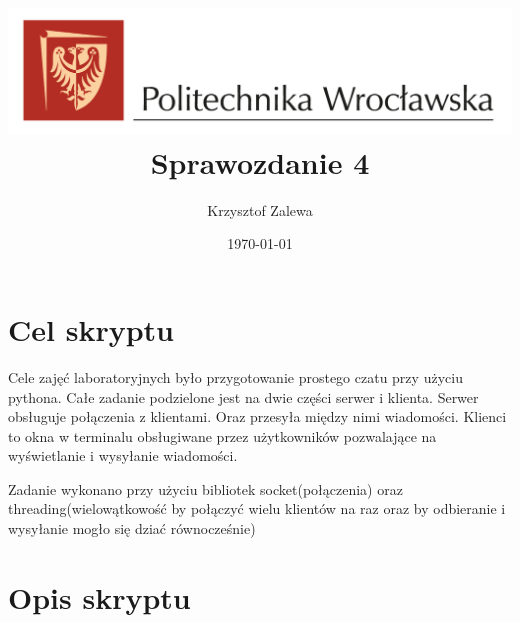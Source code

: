 \documentclass{article}
\title{
  \centering
  \includegraphics[width=\textwidth]{images/logo_PWr_kolor_poziom.png}\\
  \fontsize{28pt}{30pt}\selectfont Sprawozdanie 4\\
  }
\author{Krzysztof Zalewa}
\date{\daymonthyear\today}
\begin{document}
    \maketitle
    \pagebreak
    \tableofcontents
    \FloatBarrier
    \raggedright
    \section{Cel skryptu}
        Cele zajęć laboratoryjnych było przygotowanie prostego czatu przy użyciu pythona.
        Całe zadanie podzielone jest na dwie części serwer i klienta. Serwer obsługuje połączenia z klientami.
        Oraz przesyła między nimi wiadomości.
        Klienci to okna w terminalu obsługiwane przez użytkowników pozwalające na wyświetlanie i wysyłanie wiadomości.

        Zadanie wykonano przy użyciu bibliotek socket(połączenia) oraz threading(wielowątkowość by połączyć wielu klientów na raz
        oraz by odbieranie i wysyłanie mogło się dziać równocześnie)

    \section{Opis skryptu}
      
      
\end{document}
